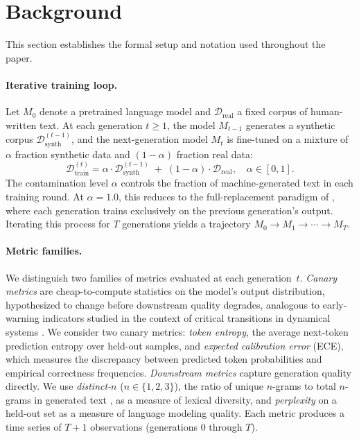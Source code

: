 \section{Background}
\label{sec:background}

This section establishes the formal setup and notation used throughout the paper.

\paragraph{Iterative training loop.}
Let $M_0$ denote a pretrained language model and $\mathcal{D}_\text{real}$ a fixed corpus of human-written text.
At each generation $t \geq 1$, the model $M_{t-1}$ generates a synthetic corpus $\mathcal{D}_\text{synth}^{(t-1)}$, and the next-generation model $M_t$ is fine-tuned on a mixture of $\alpha$ fraction synthetic data and $(1{-}\alpha)$ fraction real data:
\begin{equation}
    \mathcal{D}_\text{train}^{(t)} = \alpha \cdot \mathcal{D}_\text{synth}^{(t-1)} \;+\; (1{-}\alpha) \cdot \mathcal{D}_\text{real}, \quad \alpha \in [0, 1].
    \label{eq:mixing}
\end{equation}
The contamination level $\alpha$ controls the fraction of machine-generated text in each training round.
At $\alpha{=}1.0$, this reduces to the full-replacement paradigm of \citet{shumailov2024curse}, where each generation trains exclusively on the previous generation's output.
Iterating this process for $T$ generations yields a trajectory $M_0 \to M_1 \to \cdots \to M_T$.

\paragraph{Metric families.}
We distinguish two families of metrics evaluated at each generation~$t$.
\emph{Canary metrics} are cheap-to-compute statistics on the model's output distribution, hypothesized to change before downstream quality degrades, analogous to early-warning indicators studied in the context of critical transitions in dynamical systems \cite{scheffer2009early}.
We consider two canary metrics: \emph{token entropy}, the average next-token prediction entropy over held-out samples, and \emph{expected calibration error} (ECE), which measures the discrepancy between predicted token probabilities and empirical correctness frequencies.
\emph{Downstream metrics} capture generation quality directly.
We use \emph{distinct-$n$} ($n \in \{1, 2, 3\}$), the ratio of unique $n$-grams to total $n$-grams in generated text \cite{li2016diversity}, as a measure of lexical diversity, and \emph{perplexity} on a held-out set as a measure of language modeling quality.
Each metric produces a time series of $T{+}1$ observations (generations $0$ through $T$).

